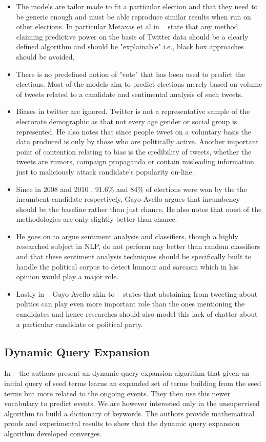 \documentclass{article}
\begin{document}
\begin{itemize}
\item
The models are tailor made to fit a particular election and that they need to be generic 
enough and must be able reproduce similar results when run on other elections.
In particular Metaxas et al in ~\cite{metaxas2011not} state that any method claiming predictive
power on the basis of Twitter data should be a clearly defined algorithm and 
should be "explainable" i.e., black box approaches should be avoided.
\item
There is no predefined notion of "vote" that has been used to predict the elections. 
Most of the models aim to predict elections merely based on volume of tweets related to
a candidate and sentimental analysis of such tweets.
\item
Biases in twitter are ignored. Twitter is not a representative sample of the electorate demographic
as that not every age gender or social group is represented. He also notes that since people
tweet on a voluntary basis the data produced is only by those who are politically active. 
Another important point of contention relating to bias is the credibility of tweets,
whether the tweets are rumors, campaign propaganda or contain misleading information just to
maliciously attack candidate's popularity on-line.
\item
Since in 2008 and 2010 , 91.6\% and 84\% of elections were won by the the incumbent candidate
respectively, Gayo-Avello argues that incumbency should be the baseline rather than just chance.
He also notes that most of the methodologies are only slightly better than chance.
\item
He goes on to argue sentiment analysis and classifiers, though a highly researched subject in NLP,
do not perform any better than random classifiers and that these sentiment analysis
techniques should be specifically built to handle the political corpus to detect humour and sarcasm
which in his opinion would play a major role.
\item
Lastly in ~\cite{gayo2011don} Gayo-Avello akin to ~\cite{mustafaraj2011vocal} states that
abstaining from tweeting about politics can play even more important role than the ones mentioning 
the candidates and hence researches should also model this lack of chatter about a particular
candidate or political party.
\end{itemize}
\subsection{Dynamic Query Expansion}
In ~\cite{liang2013dqe} the authors present an dynamic query expansion algorithm that given an
initial query of seed terms learns an expanded set of terms building from the seed terms but more
related to the ongoing events. They then use this newer vocabulary to predict events. We are however
interested only in the unsupervised algorithm to build a dictionary of keywords. The authors
provide mathematical proofs and experimental results to show that the dynamic query expansion 
algorithm developed converges. 
\end{document}
